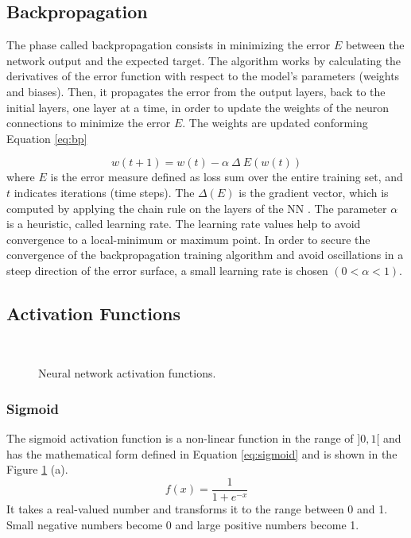 \subsection{Backpropagation}
The phase called backpropagation consists in minimizing the error $E$ between the network output and the expected target. The algorithm works by calculating the derivatives of the error
function with respect to the model’s parameters (weights and biases). Then, it propagates the error from the output layers, back to the initial layers, one layer at a time, in order to update the weights of the neuron connections to minimize the error $E$. The weights are updated conforming Equation \ref{eq:bp}

\begin{equation}
w(t+1) = w(t) - \alpha\ \Delta\ E(w(t))
\label{eq:bp}
\end{equation}
where $E$ is the error measure defined as loss sum over the entire training set, and $t$ indicates iterations (time steps). The $\Delta(E)$ is the gradient vector, which is computed by applying the chain rule on the layers of the NN \cite{rumelhart1985learning}. The parameter $\alpha$ is a heuristic, called learning rate. The learning rate values help to avoid convergence to a local-minimum or maximum point. In order to secure the convergence of the backpropagation training algorithm and avoid oscillations in a steep direction of the error surface, a small learning rate is chosen $(0 < \alpha < 1)$.

\subsection{Activation Functions}
\begin{figure}[!htb]
\centering
\hspace*{0.2in} %
\\
\hspace*{0.2in} %


\caption{Neural network activation functions. } \label{fig:activation}
\end{figure}
\subsubsection{Sigmoid}
The sigmoid activation function is a non-linear function in the range of $]0, 1[$ and has the mathematical form defined in Equation \ref{eq:sigmoid} and is shown in the Figure \ref{fig:activation} (a).
\begin{equation}
f(x) = \frac{1}{1+e^{-x}}
\label{eq:sigmoid}
\end{equation}
It takes a real-valued number and transforms it to the range between 0 and 1. Small negative numbers become 0 and large positive numbers become 1. 
